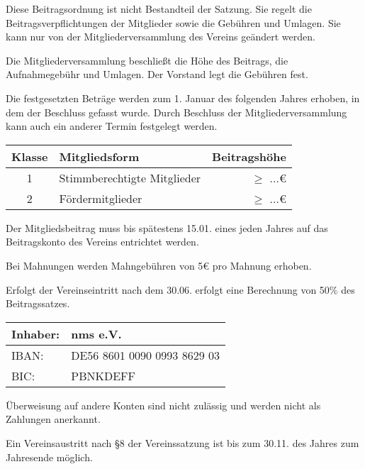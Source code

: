 \begin{beitrag}

  Diese Beitragsordnung ist nicht Bestandteil der Satzung. Sie regelt die Beitragsverpflichtungen der Mitglieder sowie die Gebühren und Umlagen. Sie kann nur von der Mitgliederversammlung des Vereins geändert werden.

  Die Mitgliederversammlung beschließt die Höhe des Beitrags, die Aufnahmegebühr und Umlagen. Der Vorstand legt die Gebühren fest.

  Die festgesetzten Beträge werden zum 1. Januar des folgenden Jahres erhoben, in dem der Beschluss gefasst wurde. Durch Beschluss der Mitgliederversammlung kann auch ein anderer Termin festgelegt werden.


  \begin{center}
    \begin{tabular}{ |c|l|r| }
      \hline
      Klasse & Mitgliedsform               & Beitragshöhe     \\
      \hline \hline
      1      & Stimmberechtigte Mitglieder & $\ge$ ...\euro       \\
      2      & Fördermitglieder            & $\ge$ ...\euro \\
      \hline
    \end{tabular}
  \end{center}

  Der Mitgliedsbeitrag muss bis spätestens 15.01. eines jeden Jahres auf das Beitragskonto des Vereins entrichtet werden.

  Bei Mahnungen werden Mahngebühren von 5\euro{} pro Mahnung erhoben.

  Erfolgt der Vereinseintritt nach dem 30.06. erfolgt eine Berechnung von 50\% des Beitragssatzes.


  \begin{center}
    \begin{tabular}{ |ll| }
      \hline
      Inhaber: & nms e.V.                     \\
      \hline
      IBAN:    & DE56 8601 0090 0993 8629 03 \\
      \hline
      BIC:     & PBNKDEFF                    \\
      \hline
    \end{tabular}
  \end{center}

  Überweisung auf andere Konten sind nicht zulässig und werden nicht als Zahlungen anerkannt.

  Ein Vereinsaustritt nach \S 8 der Vereinssatzung ist bis zum 30.11. des Jahres zum Jahresende möglich. 

\end{beitrag}

